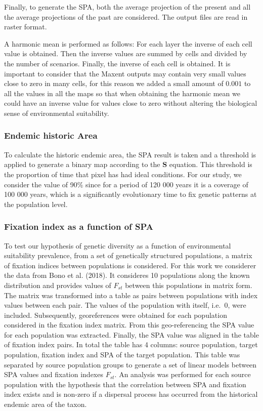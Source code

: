 \documentclass[
]{article}
\begin{document}
Finally, to generate the SPA, both the average projection of the present
and all the average projections of the past are considered. The output
files are read in raster format.

A harmonic mean is performed as follows: For each layer the inverse of
each cell value is obtained. Then the inverse values are summed by cells
and divided by the number of scenarios. Finally, the inverse of each
cell is obtained. It is important to consider that the Maxent outputs
may contain very small values close to zero in many cells, for this
reason we added a small amount of \(0.001\) to all the values in all the
maps so that when obtaining the harmonic mean we could have an inverse
value for values close to zero without altering the biological sense of
environmental suitability.

\hypertarget{endemic-historic-area}{%
\subsubsection{Endemic historic Area}\label{endemic-historic-area}}

To calculate the historic endemic area, the SPA result is taken and a
threshold is applied to generate a binary map according to the
\(\mathbf{S}\) equation. This threshold is the proportion of time that
pixel has had ideal conditions. For our study, we consider the value of
90\% since for a period of 120 000 years it is a coverage of 100 000
years, which is a significantly evolutionary time to fix genetic
patterns at the population level.

\hypertarget{fixation-index-as-a-function-of-spa}{%
\subsubsection{Fixation index as a function of
SPA}\label{fixation-index-as-a-function-of-spa}}

To test our hypothesis of genetic diversity as a function of
environmental suitability prevalence, from a set of genetically
structured populations, a matrix of fixation indices between populations
is considered. For this work we considerer the data from Bono et al.
(2018). It consideres 10 populations along the known distribution and
provides values of \(F_{st}\) between this populations in matrix form.
The matrix was transformed into a table as pairs between populations
with index values between each pair. The values of the population with
itself, i.e.~\(0\), were included. Subsequently, georeferences were
obtained for each population considered in the fixation index matrix.
From this geo-referencing the SPA value for each population was
extracted. Finally, the SPA value was aligned in the table of fixation
index pairs. In total the table has 4 columns: source population, target
population, fixation index and SPA of the target population. This table
was separated by source population groups to generate a set of linear
models between SPA values and fixation indexes \(F_{st}\). An analysis
was performed for each source population with the hypothesis that the
correlation between SPA and fixation index exists and is non-zero if a
dispersal process has occurred from the historical endemic area of the
taxon.
\end{document}
